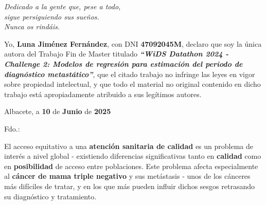 %
% 



\cleardoublepage
\thispagestyle{empty}

\vspace*{9cm}  
\begin{flushright} \em 
Dedicado a la gente que, pese a todo,\\
sigue persiguiendo sus sueños.\\
Nunca os rindáis.
\end{flushright}


\cleardoublepage
\thispagestyle{plain}
\setcounter{page}{1} \null
\begin{center}
\Large{}
\end{center}
\vskip1cm

Yo, \textbf{Luna Jiménez Fernández}, con DNI \textbf{47092045M}, declaro que soy la única autora del Trabajo Fin de Master titulado \textbf{\textit{``WiDS Datathon 2024 - Challenge 2: Modelos de regresión para estimación del periodo de diagnóstico metastático''}}, que el citado trabajo no infringe las leyes en vigor sobre propiedad intelectual, y que todo el material no original contenido en dicho trabajo está apropiadamente atribuido a sus legítimos autores.

\vspace*{2cm}
\begin{center}
Albacete, a \textbf{10} de \textbf{Junio} de \textbf{2025}

\vskip3cm

Fdo.: \textbf{\autor}
\end{center}


\cleardoublepage
\thispagestyle{plain}
\begin{center}
\Large{}
\end{center}
\vskip1cm

El acceso equitativo a una \textbf{atención sanitaria de calidad} es un problema de interés a nivel global - existiendo diferencias significativas tanto en \textbf{calidad} como en \textbf{posibilidad} de acceso entre poblaciones. Este problema afecta especialmente al \textbf{cáncer de mama triple negativo} y sus metástasis - unos de los cánceres más difíciles de tratar, y en los que más pueden influir dichos sesgos retrasando su diagnóstico y tratamiento.

